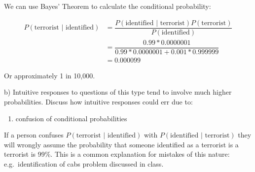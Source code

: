 \documentclass[
  letterpaper,
  DIV=11,
  numbers=noendperiod]{scrreprt}
\providecommand{\tightlist}{%
  \setlength{\itemsep}{0pt}\setlength{\parskip}{0pt}}\usepackage{longtable,booktabs,array}
\begin{document}
\begin{tcolorbox}[enhanced jigsaw, title=\textcolor{quarto-callout-tip-color}{\faLightbulb}\hspace{0.5em}{Answer}, toprule=.15mm, colback=white, breakable, titlerule=0mm, colframe=quarto-callout-tip-color-frame, coltitle=black, opacityback=0, rightrule=.15mm, colbacktitle=quarto-callout-tip-color!10!white, bottomtitle=1mm, opacitybacktitle=0.6, arc=.35mm, bottomrule=.15mm, toptitle=1mm, leftrule=.75mm, left=2mm]

We can use Bayes' Theorem to calculate the conditional probability:

\[
\begin{aligned}
P(\text{terrorist | identified}) &= \dfrac{P(\text{identified | terrorist})P(\text{terrorist})}{P(\text{identified})} \\[12 pt]
&= \dfrac{0.99*0.0000001}{0.99*0.0000001+0.001*0.999999} \\[12 pt]
&= 0.000099
\end{aligned}
\]

Or approximately 1 in 10,000.

\end{tcolorbox}

b) Intuitive responses to questions of this type tend to involve much
higher probabilities. Discuss how intuitive responses could err due to:

\begin{enumerate}
\def\labelenumi{\roman{enumi})}
\tightlist
\item
  confusion of conditional probabilities
\end{enumerate}

\begin{tcolorbox}[enhanced jigsaw, title=\textcolor{quarto-callout-tip-color}{\faLightbulb}\hspace{0.5em}{Answer}, toprule=.15mm, colback=white, breakable, titlerule=0mm, colframe=quarto-callout-tip-color-frame, coltitle=black, opacityback=0, rightrule=.15mm, colbacktitle=quarto-callout-tip-color!10!white, bottomtitle=1mm, opacitybacktitle=0.6, arc=.35mm, bottomrule=.15mm, toptitle=1mm, leftrule=.75mm, left=2mm]

If a person confuses \(P(\text{terrorist | identified})\) with
\(P(\text{identified | terrorist})\) they will wrongly assume the
probability that someone identified as a terrorist is a terrorist is
99\%. This is a common explanation for mistakes of this nature:
e.g.~identification of cabs problem discussed in class.

\end{tcolorbox}
\end{document}
